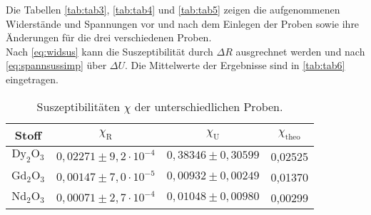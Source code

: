 Die Tabellen \autoref{tab:tab3}, \autoref{tab:tab4} und \autoref{tab:tab5} zeigen die aufgenommenen Widerstände und Spannungen vor und nach dem
Einlegen der Proben sowie ihre Änderungen für die drei verschiedenen Proben.\\
Nach \eqref{eq:widsus} kann die Suszeptibilität durch $ \Delta R $ ausgrechnet werden und nach \eqref{eq:spannsussimp} über $\Delta U$.
Die Mittelwerte der Ergebnisse sind in \autoref{tab:tab6} eingetragen.


\begin{table}[H]
    \centering
    \caption{Suszeptibilitäten $\chi$ der unterschiedlichen Proben.}
    \label{tab:tab6}
    \begin{tabular}{S S S S}
      \toprule
       {Stoff} & {$\chi_{\text{R}}$} & {$\chi_{\text{U}}$} &{$\chi_{\text{theo}}$}  \\
      \midrule
      {$\text{Dy}_2\text{O}_3$}  &{$0,02271 \pm 9,2 \cdot 10^{-4}$}    &{$ 0,38346 \pm 0,30599$} &{0,02525}         \\
      {$\text{Gd}_2\text{O}_3$}  &{$0,00147 \pm 7,0 \cdot 10^{-5}$}    &{$ 0,00932 \pm 0,00249$} &{0,01370}             \\
      {$\text{Nd}_2\text{O}_3$}  &{$0,00071 \pm 2,7 \cdot 10^{-4}$}    &{$ 0,01048 \pm 0,00980$} &{0,00299}         \\
      \bottomrule
    \end{tabular}
\end{table}
